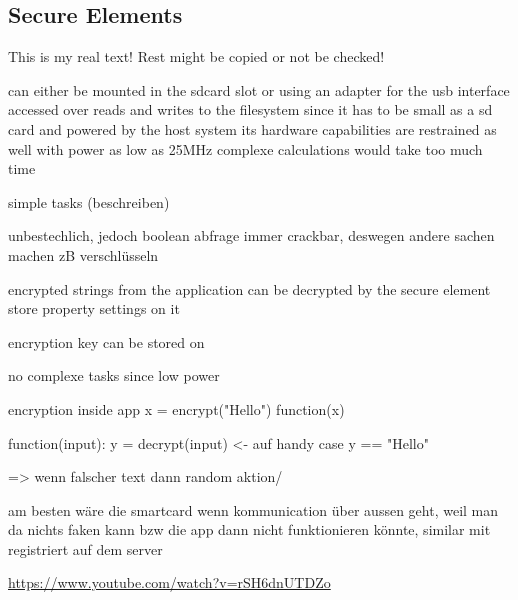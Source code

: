 \subsection{Secure Elements} \label{subsection:counter-external-secure}
This is my real text! Rest might be copied or not be checked!

can either be mounted in the sdcard slot or using an adapter for the usb interface
accessed over reads and writes to the filesystem
since it has to be small as a sd card and powered by the host system its hardware capabilities are restrained as well \cite{stSe} with power as low as 25MHz complexe calculations would take too much time

simple tasks (beschreiben)

unbestechlich, jedoch boolean abfrage immer crackbar, deswegen andere sachen machen zB verschlüsseln

encrypted strings from the application can be decrypted by the secure element
store property settings on it

encryption key can be stored on

no complexe tasks since low power


encryption inside app
x = encrypt("Hello")
function(x)

function(input):
y = decrypt(input) <- auf handy
case y == "Hello"

=> wenn falscher text dann random aktion/


am besten wäre die smartcard wenn kommunication über aussen geht, weil man da nichts faken kann bzw die app dann nicht funktionieren könnte, similar mit registriert auf dem server

\url{https://www.youtube.com/watch?v=rSH6dnUTDZo}

